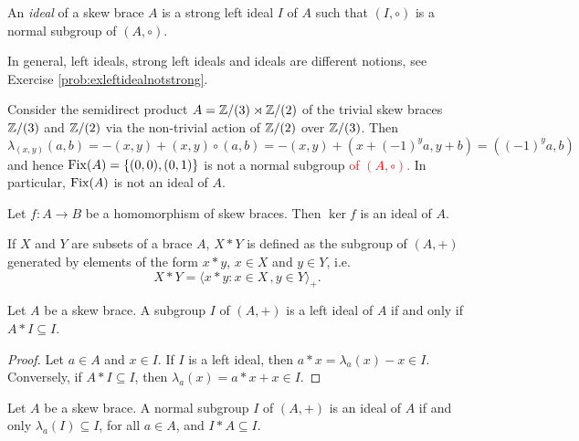 \begin{definition}
    An \emph{ideal} of a skew brace $A$ is a strong left ideal $I$ of $A$ such that 
	$(I,\circ)$ is a normal subgroup of $(A,\circ)$. 
\end{definition}

In general, left ideals, strong left ideals and ideals are
different notions, see Exercise \ref{prob:exleftidealnotstrong}. 

\begin{example}
    Consider the semidirect product $A=\mathbb{Z}/(3)\rtimes \mathbb{Z}/(2)$ of the
    trivial skew braces $\mathbb{Z}/(3)$ and $\mathbb{Z}/(2)$
    via the non-trivial action of $\mathbb{Z}/(2)$ over $\mathbb{Z}/(3)$.
    Then 
    \[
    \lambda_{(x,y)}(a,b)=-(x,y)+(x,y)\circ(a,b)=-(x,y)+(x+(-1)^ya,y+b)=((-1)^ya,b)
    \]
    and hence $\operatorname{Fix}(A)=\{(0,0),(0,1)\}$ is not a 
    normal subgroup \textcolor{red}{of $(A,\circ)$.} In particular, $\operatorname{Fix}(A)$ is not 
    an ideal of $A$.
\end{example}

\begin{example}
	Let $f\colon A\to B$ be a homomorphism of skew braces. Then $\ker f$ 
	is an ideal of $A$.
\end{example}

If $X$ and $Y$ are subsets of a brace $A$, $X*Y$ is defined as the 
subgroup of $(A,+)$ generated by elements of the form $x*y$, $x\in X$ and $y\in Y$, i.e.
\[
X*Y=\langle x*y:x\in X\,,y\in Y\rangle_+.
\]

\begin{proposition}
    \label{pro:A*I}
    Let $A$ be a skew brace. A subgroup $I$ of $(A,+)$ is 
    a left ideal of $A$ if and only if $A*I\subseteq I$.
\end{proposition}

\begin{proof}
    Let $a\in A$ and $x\in I$. If $I$ is a
    left ideal, then $a*x=\lambda_a(x)-x\in I$. Conversely, if $A*I\subseteq
    I$, then $\lambda_a(x)=a*x+x\in I$.
\end{proof}

\begin{proposition}
    \label{pro:I*A}
    Let $A$ be a skew brace. A normal subgroup $I$ of $(A,+)$
    is an ideal of $A$ if and only $\lambda_a(I)\subseteq I$, for all $a\in A$, and
    $I*A\subseteq I$.
\end{proposition}

